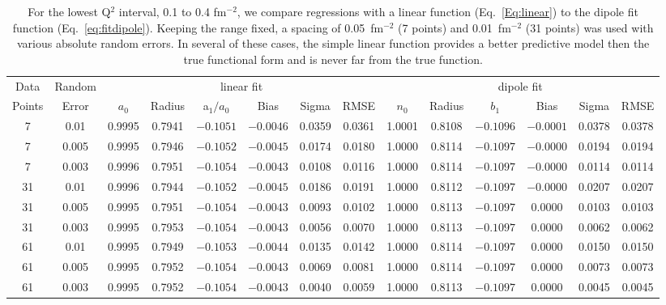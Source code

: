 \documentclass[10pt,aps,prc,twocolumn]{revtex4-1}
\begin{document}
\begin{table}
\caption{For the lowest Q$^2$ interval, 0.1 to 0.4 fm$^{-2}$, we compare regressions with
a linear function (Eq.~\ref{Eq:linear}) to the dipole fit function (Eq.~\ref{eq:fitdipole}).   Keeping the range
fixed, a spacing of 0.05~fm$^{-2}$ (7 points) and 0.01~fm$^{-2}$ (31 points) was used
with various absolute random errors.  In several of these cases, the simple linear 
function provides a better predictive model then the true functional form and is never 
far from the true function.}
\begin{tabular}{cc|cccccc|cccccc} \hline
Data   & Random   & \multicolumn{6}{c|}{linear fit}                       & \multicolumn{6}{c}{dipole fit}            \\ 
Points & Error    & $a_0$ & Radius&a$_1/a_0$&  Bias  & Sigma &  RMSE  & $n_0$ & Radius& $b_1$  &  Bias  & Sigma &  RMSE   \\  \hline
7      & 0.01     & 0.9995& 0.7941& $-0.1051$& $-0.0046$& 0.0359& 0.0361 & 1.0001& 0.8108& $-0.1096$& $-0.0001$& 0.0378& 0.0378  \\ 
7      & 0.005    & 0.9995& 0.7946& $-0.1052$& $-0.0045$& 0.0174& 0.0180 & 1.0000& 0.8114& $-0.1097$& $-0.0000$& 0.0194& 0.0194  \\
7      & 0.003    & 0.9996& 0.7951& $-0.1054$& $-0.0043$& 0.0108& 0.0116 & 1.0000& 0.8114& $-0.1097$& $-0.0000$& 0.0114& 0.0114  \\ \hline
31     & 0.01     & 0.9996& 0.7944& $-0.1052$& $-0.0045$& 0.0186& 0.0191 & 1.0000& 0.8112& $-0.1097$& $-0.0000$& 0.0207& 0.0207  \\
31     & 0.005    & 0.9995& 0.7951& $-0.1054$& $-0.0043$& 0.0093& 0.0102 & 1.0000& 0.8113& $-0.1097$&  0.0000& 0.0103& 0.0103  \\
31     & 0.003    & 0.9995& 0.7953& $-0.1054$& $-0.0043$& 0.0056& 0.0070 & 1.0000& 0.8113& $-0.1097$&  0.0000& 0.0062& 0.0062   \\ \hline 
61     & 0.01     & 0.9995& 0.7949& $-0.1053$& $-0.0044$& 0.0135& 0.0142 & 1.0000& 0.8114& $-0.1097$&  0.0000& 0.0150& 0.0150  \\ 
61     & 0.005    & 0.9995& 0.7952& $-0.1054$& $-0.0043$& 0.0069& 0.0081 & 1.0000& 0.8114& $-0.1097$&  0.0000& 0.0073& 0.0073  \\ 
61     & 0.003    & 0.9995& 0.7952& $-0.1054$& $-0.0043$& 0.0040& 0.0059 & 1.0000& 0.8113& $-0.1097$&  0.0000& 0.0045& 0.0045  \\ \hline 
\end{tabular}
\label{simpleVSperfect}
\end{table}
\end{document}
